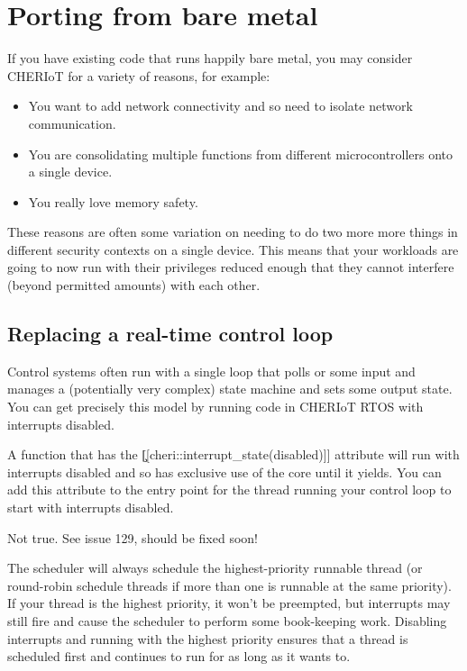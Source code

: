 \chapter{Porting from bare metal}

If you have existing code that runs happily bare metal, you may consider CHERIoT for a variety of reasons, for example:

\begin{itemize}
	\item{You want to add network connectivity and so need to isolate network communication.}
	\item{You are consolidating multiple functions from different microcontrollers onto a single device.}
	\item{You really love memory safety.}
\end{itemize}

These reasons are often some variation on needing to do two more more things in different security contexts on a single device.
This means that your workloads are going to now run with their privileges reduced enough that they cannot interfere (beyond permitted amounts) with each other.

\section{Replacing a real-time control loop}

Control systems often run with a single loop that polls or some input and manages a (potentially very complex) state machine and sets some output state.
You can get precisely this model by running code in CHERIoT RTOS with interrupts disabled.

A function that has the \c{[[cheri::interrupt_state(disabled)]]} attribute will run with interrupts disabled and so has exclusive use of the core until it yields.
You can add this attribute to the entry point for the thread running your control loop to start with interrupts disabled.

\begin{warning}
Not true.
See issue 129, should be fixed soon! 
\end{warning}

The scheduler will always schedule the highest-priority runnable thread (or round-robin schedule threads if more than one is runnable at the same priority).
If your thread is the highest priority, it won't be preempted, but interrupts may still fire and cause the scheduler to perform some book-keeping work.
Disabling interrupts and running with the highest priority ensures that a thread is scheduled first and continues to run for as long as it wants to.

